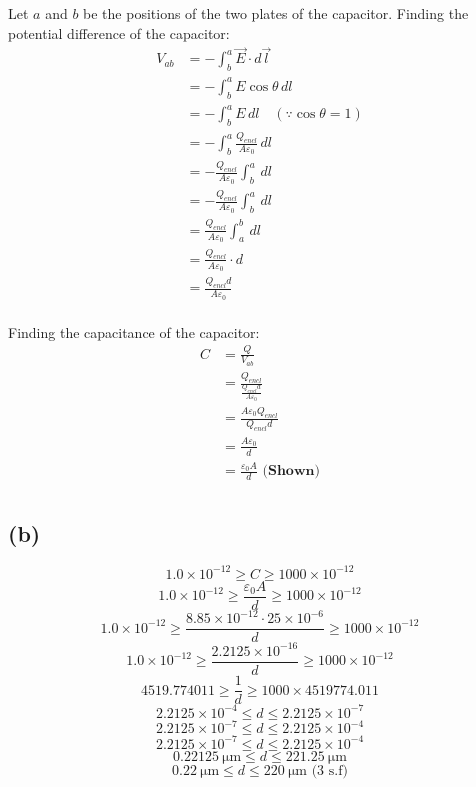 \documentclass[11pt]{article}
\begin{document}
\newpage

Let \(a\) and \(b\) be the positions of the two plates of the capacitor. Finding the potential difference of the capacitor:
\begin{align*}
V_{ab} &= - \int_b^a \vec{E} \cdot d \vec{l} \\
&= - \int_b^a E \cos \theta \, dl \\
&= - \int_b^a E \, dl \quad (\because \cos \theta = 1) \\
&= - \int_b^a \frac{Q_{encl}}{A \varepsilon_0} \, dl \\
&= - \frac{Q_{encl}}{A \varepsilon_0} \int_b^a \, dl \\
&= - \frac{Q_{encl}}{A \varepsilon_0} \int_b^a \, dl \\
&= \frac{Q_{encl}}{A \varepsilon_0} \int_a^b \, dl \\
&= \frac{Q_{encl}}{A \varepsilon_0} \cdot d \\
&= \frac{Q_{encl}d}{A \varepsilon_0} \\
\end{align*}

Finding the capacitance of the capacitor:
\begin{align*}
C &= \frac{Q}{V_{ab}} \\
&= \frac{Q_{encl}}{\frac{Q_{encl}d}{A \varepsilon_0}} \\
&= \frac{A \varepsilon_0 Q_{encl}}{Q_{encl} d} \\
&= \frac{A \varepsilon_0}{d} \\
&= \frac{\varepsilon_0 A}{d} \textbf{ (Shown)} \\
\end{align*}

\newpage

\subsection{(b)}
\label{sec:orgd85fb44}
\[1.0 \times 10^{-12} \ge C \ge 1000 \times 10^{-12}\]
\[1.0 \times 10^{-12} \ge \frac{\varepsilon_0 A}{d} \ge 1000 \times 10^{-12}\]
\[1.0 \times 10^{-12} \ge \frac{8.85 \times 10^{-12} \cdot 25 \times 10^{-6}}{d} \ge 1000 \times 10^{-12}\]
\[1.0 \times 10^{-12} \ge \frac{2.2125 \times 10^{-16}}{d} \ge 1000 \times 10^{-12}\]
\[4519.774011 \ge \frac{1}{d} \ge 1000 \times 4519774.011\]
\[2.2125 \times 10^{-4} \le d \le 2.2125 \times 10^{-7}\]
\[2.2125 \times 10^{-7} \le d \le 2.2125 \times 10^{-4}\]
\[2.2125 \times 10^{-7} \le d \le 2.2125 \times 10^{-4}\]
\[\qty{0.22125}{\unit{\micro\metre}} \le d \le \qty{221.25}{\unit{\micro\metre}}\]
\[\qty{0.22}{\unit{\micro\metre}} \le d \le \qty{220}{\unit{\micro\metre}} \text{ (3 s.f)}\]
\end{document}
